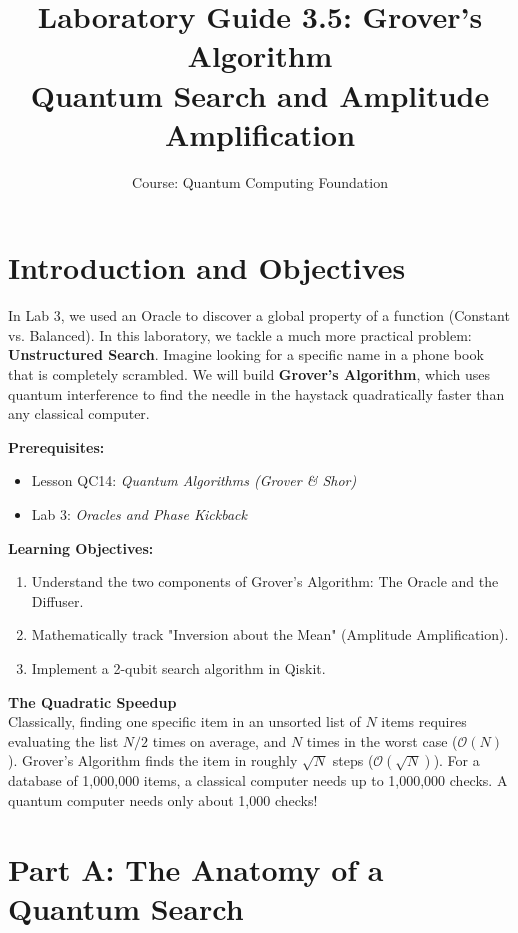 \documentclass[a4paper,11pt]{article}
\title{\textbf{Laboratory Guide 3.5: Grover's Algorithm}\\
\large Quantum Search and Amplitude Amplification}
\author{Course: Quantum Computing Foundation}
\date{}
\begin{document}
\maketitle

\section{Introduction and Objectives}
In Lab 3, we used an Oracle to discover a global property of a function (Constant vs. Balanced). In this laboratory, we tackle a much more practical problem: \textbf{Unstructured Search}. Imagine looking for a specific name in a phone book that is completely scrambled. We will build \textbf{Grover's Algorithm}, which uses quantum interference to find the needle in the haystack quadratically faster than any classical computer.

\vspace{0.3cm}
\noindent \textbf{Prerequisites:}
\begin{itemize}
    \item Lesson QC14: \textit{Quantum Algorithms (Grover \& Shor)}
    \item Lab 3: \textit{Oracles and Phase Kickback}
\end{itemize}

\noindent \textbf{Learning Objectives:}
\begin{enumerate}
    \item Understand the two components of Grover's Algorithm: The Oracle and the Diffuser.
    \item Mathematically track "Inversion about the Mean" (Amplitude Amplification).
    \item Implement a 2-qubit search algorithm in Qiskit.
\end{enumerate}

\begin{warningbox}
\textbf{The Quadratic Speedup}\\
Classically, finding one specific item in an unsorted list of $N$ items requires evaluating the list $N/2$ times on average, and $N$ times in the worst case ($\mathcal{O}(N)$).
Grover's Algorithm finds the item in roughly $\sqrt{N}$ steps ($\mathcal{O}(\sqrt{N})$).
For a database of 1,000,000 items, a classical computer needs up to 1,000,000 checks. A quantum computer needs only about 1,000 checks!
\end{warningbox}

\newpage

\section{Part A: The Anatomy of a Quantum Search}
\end{document}
